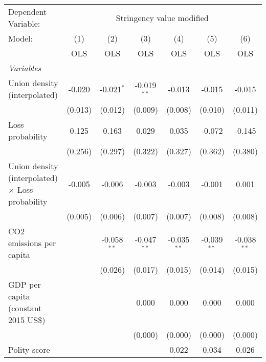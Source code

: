 
\begingroup
\centering
\begin{tabular}{lcccccc}
   \toprule
   Dependent Variable: & \multicolumn{6}{c}{Stringency value modified}\\
   Model:                                                  & (1)     & (2)           & (3)           & (4)           & (5)           & (6)\\  
                                                           &  OLS    & OLS           & OLS           & OLS           & OLS           & OLS\\  
   \midrule
   \emph{Variables}\\
   Union density (interpolated)                            & -0.020  & -0.021$^{*}$  & -0.019$^{**}$ & -0.013        & -0.015        & -0.015\\   
                                                           & (0.013) & (0.012)       & (0.009)       & (0.008)       & (0.010)       & (0.011)\\   
   Loss probability                                        & 0.125   & 0.163         & 0.029         & 0.035         & -0.072        & -0.145\\   
                                                           & (0.256) & (0.297)       & (0.322)       & (0.327)       & (0.362)       & (0.380)\\   
   Union density (interpolated) $\times$ Loss probability  & -0.005  & -0.006        & -0.003        & -0.003        & -0.001        & 0.001\\   
                                                           & (0.005) & (0.006)       & (0.007)       & (0.007)       & (0.008)       & (0.008)\\   
   CO2 emissions per capita                                &         & -0.058$^{**}$ & -0.047$^{**}$ & -0.035$^{**}$ & -0.039$^{**}$ & -0.038$^{**}$\\   
                                                           &         & (0.026)       & (0.017)       & (0.015)       & (0.014)       & (0.015)\\   
   GDP per capita (constant 2015 US\$)                     &         &               & 0.000         & 0.000         & 0.000         & 0.000\\   
                                                           &         &               & (0.000)       & (0.000)       & (0.000)       & (0.000)\\   
   Polity score                                            &         &               &               & 0.022         & 0.034         & 0.026\\   

\end{tabular}
